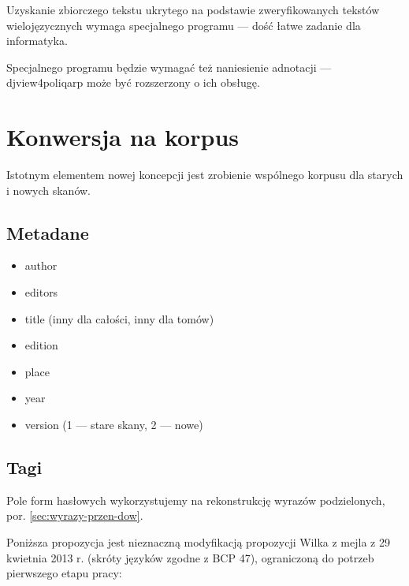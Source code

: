 \documentclass[12]{mwart}
\newcommand{\program}[1]{\textsf{#1}}
\begin{document}
Uzyskanie zbiorczego tekstu ukrytego na podstawie zweryfikowanych
tekstów wielojęzycznych wymaga specjalnego programu --- dość łatwe
zadanie dla informatyka.

Specjalnego programu będzie wymagać też naniesienie adnotacji ---
\program{djview4poliqarp} może być rozszerzony o ich obsługę.

\section{Konwersja na korpus}
\label{sec:konwersja-na-korpus}

Istotnym elementem nowej koncepcji jest zrobienie wspólnego korpusu
dla starych i nowych skanów.

\subsection{Metadane}
\label{sec:metadane}

\begin{itemize}
\item author
\item editors
\item title (inny dla całości, inny dla tomów)
\item edition
\item place
\item year
\item version (1 --- stare skany, 2 --- nowe)
\end{itemize}

\subsection{Tagi}
\label{sec:tagi}

Pole form hasłowych wykorzystujemy na rekonstrukcję wyrazów
podzielonych, por. \ref{sec:wyrazy-przen-dow}.


Poniższa propozycja jest nieznaczną modyfikacją propozycji Wilka z
mejla z 29 kwietnia 2013 r. (skróty języków zgodne z BCP 47),
ograniczoną do potrzeb pierwszego etapu pracy:
\end{document}
